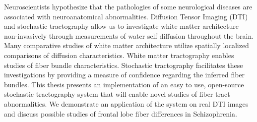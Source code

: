 % 
% 
%
Neuroscientists hypothesize that the pathologies of some neurological diseases are associated with neuroanatomical abnormalities.  Diffusion Tensor Imaging (DTI) and stochastic tractography allow us to investigate white matter architecture non-invasively through measurements of water self diffusion throughout the brain. Many comparative studies of white matter architecture utilize spatially localized comparisons of diffusion characteristics.  White matter tractography enables studies of fiber bundle characteristics.  Stochastic tractography facilitates these investigations by providing a measure of confidence regarding the inferred fiber bundles.  This thesis presents an implementation of an easy to use, open-source stochastic tractography system that will enable novel studies of fiber tract abnormalities.  We demonstrate an application of the system on real DTI images and discuss possible studies of frontal lobe fiber differences in Schizophrenia.
